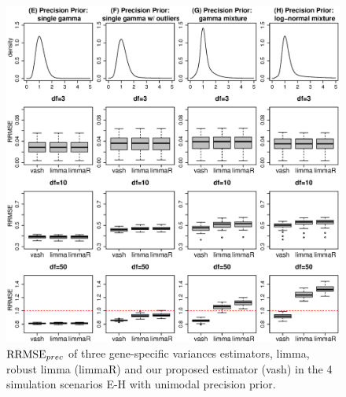 \documentclass{bioinfo}
\begin{document}
\begin{figure}[!hbp]
\includegraphics[width=\linewidth]{relmse2_prec.eps}
\caption{$\textrm{RRMSE}_{prec}$ of three gene-specific variances estimators, limma, robust limma (limmaR) and our proposed estimator (vash) in the 4 simulation scenarios E-H with unimodal precision prior.}
\label{fg:rrmse2}
\end{figure}

\end{document}
